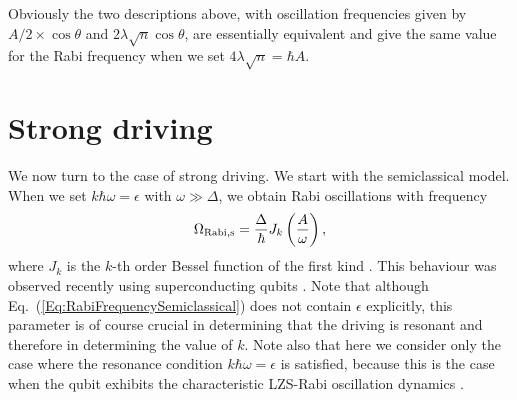 \documentclass[aps,twocolumn,superscriptaddress]{revtex4}
\begin{document}
Obviously the two descriptions above, with oscillation frequencies given by $A/2\times\cos\theta$ and $2\lambda\sqrt{n}\cos\theta$, are essentially equivalent and give the same value for the Rabi frequency when we set $4\lambda\sqrt{n}=\hbar A$.



\section{Strong driving}
\label{Sec:StrongDriving}

We now turn to the case of strong driving. We start with the semiclassical model. When we set $k\hbar\omega=\epsilon$ with $\omega\gg\Delta$, we obtain Rabi oscillations with frequency
%
\begin{equation}
\Omega_{\rm Rabi,s} = \frac{\Delta}{\hbar} J_k\left(\frac{A}{\omega}\right),
%
\label{Eq:RabiFrequencySemiclassical}
\end{equation} 
%
where $J_k$ is the $k$-th order Bessel function of the first kind \cite{Shirley}. This behaviour was observed recently using superconducting qubits \cite{Nakamura,Saito2004}. Note that although Eq.~(\ref{Eq:RabiFrequencySemiclassical}) does not contain $\epsilon$ explicitly, this parameter is of course crucial in determining that the driving is resonant and therefore in determining the value of $k$. Note also that here we consider only the case where the resonance condition $k\hbar\omega=\epsilon$ is satisfied, because this is the case when the qubit exhibits the characteristic LZS-Rabi oscillation dynamics \cite{Shevchenko}.
\end{document}
